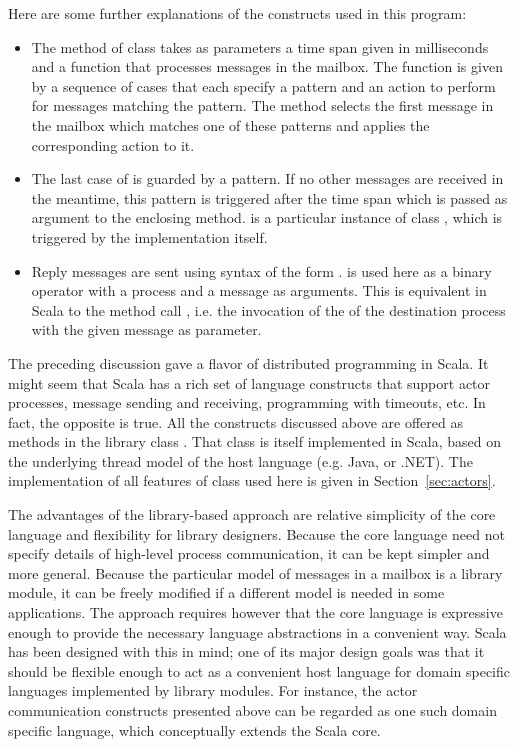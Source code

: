 \documentclass[a4paper,12pt,twoside,titlepage]{book}
\begin{document}
Here are some further explanations of the constructs used in this
program:
\begin{itemize}
\item
The  method of class  takes as
parameters a time span given in milliseconds and a function that
processes messages in the mailbox. The function is given by a sequence
of cases that each specify a pattern and an action to perform for
messages matching the pattern. The  method selects
the first message in the mailbox which matches one of these patterns
and applies the corresponding action to it.
\item
The last case of  is guarded by a
 pattern. If no other messages are received in the meantime, this
pattern is triggered after the time span which is passed as argument
to the enclosing  method.  is a
particular instance of class , which is triggered by the
 implementation itself.
\item
Reply messages are sent using syntax of the form
.  is used here as a
binary operator with a process and a message as arguments. This is
equivalent in Scala to the method call
, i.e. the invocation of
the  of the destination process with the given message as
parameter.
\end{itemize}
The preceding discussion gave a flavor of distributed programming in
Scala. It might seem that Scala has a rich set of language constructs
that support actor processes, message sending and receiving,
programming with timeouts, etc. In fact, the opposite is true. All the
constructs discussed above are offered as methods in the library class
. That class is itself implemented in Scala, based on the underlying 
thread model of the host language (e.g. Java, or .NET).
The implementation of all features of class  used here is
given in Section~\ref{sec:actors}.

The advantages of the library-based approach are relative simplicity
of the core language and flexibility for library designers. Because
the core language need not specify details of high-level process
communication, it can be kept simpler and more general. Because the
particular model of messages in a mailbox is a library module, it can
be freely modified if a different model is needed in some
applications.  The approach requires however that the core language is
expressive enough to provide the necessary language abstractions in a
convenient way. Scala has been designed with this in mind; one of its
major design goals was that it should be flexible enough to act as a
convenient host language for domain specific languages implemented by
library modules. For instance, the actor communication constructs
presented above can be regarded as one such domain specific language,
which conceptually extends the Scala core.
\end{document}
